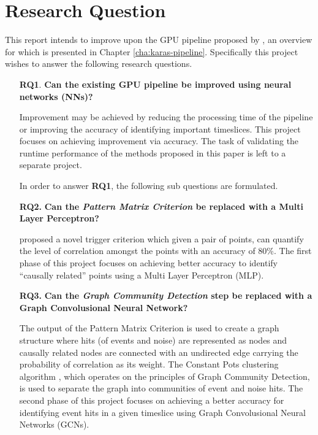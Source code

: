 \section{Research Question}
This report intends to improve upon the GPU pipeline proposed by
\citeauthor{karas2019data}, an overview for which is presented in
Chapter \ref{cha:karas-pipeline}. Specifically this project wishes to
answer the following research questions.

\begin{enumerate}
  \item[\textbf{RQ1}.] \textbf{Can the existing GPU pipeline be improved using neural networks (NNs)?}

    Improvement may be achieved by reducing the processing time of the
    pipeline or improving the accuracy of identifying important
    timeslices. This project focuses on achieving improvement via
    accuracy. The task of validating the runtime performance of the
    methods proposed in this paper is left to a separate project.

    In order to answer \textbf{RQ1}, the following sub questions are
    formulated.

  \item[\textbf{RQ2.}] \textbf{Can the \emph{Pattern Matrix Criterion} be replaced with a Multi Layer Perceptron?}

    \citeauthor{karas2019data} proposed a novel trigger criterion
    which given a pair of points, can quantify the level of
    correlation amongst the points with an accuracy of 80\%. The first
    phase of this project focuses on achieving better accuracy to
    identify ``causally related'' points using a Multi Layer
    Perceptron (MLP).
    
  \item[\textbf{RQ3.}] \textbf{Can the \emph{Graph Community Detection} step be replaced with a Graph Convolusional Neural Network?}

    The output of the Pattern Matrix Criterion is used to create a
    graph structure where hits (of events and noise) are represented
    as nodes and causally related nodes are connected with an
    undirected edge carrying the probability of correlation as its
    weight. The Constant Pots clustering algorithm \cite{CITEME},
    which operates on the principles of Graph Community Detection, is
    used to separate the graph into communities of event and noise
    hits. The second phase of this project focuses on achieving a
    better accuracy for identifying event hits in a given timeslice
    using Graph Convolusional Neural Networks (GCNs).
    
\end{enumerate}
